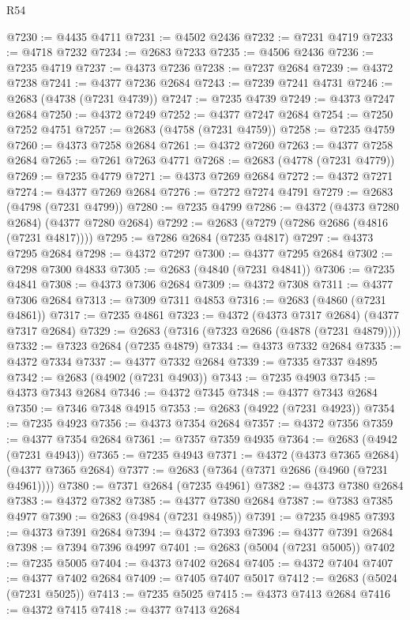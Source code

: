 \begin{lexlean}{R54}
\begin{coremodule}
@7230 := @4435 @4711
@7231 := @4502 @2436
@7232 := @7231 @4719
@7233 := @4718 @7232
@7234 := @2683 @7233
@7235 := @4506 @2436
@7236 := @7235 @4719
@7237 := @4373 @7236
@7238 := @7237 @2684
@7239 := @4372 @7238
@7241 := @4377 @7236 @2684
@7243 := @7239 @7241 @4731
@7246 := @2683 (@4738 (@7231 @4739))
@7247 := @7235 @4739
@7249 := @4373 @7247 @2684
@7250 := @4372 @7249
@7252 := @4377 @7247 @2684
@7254 := @7250 @7252 @4751
@7257 := @2683 (@4758 (@7231 @4759))
@7258 := @7235 @4759
@7260 := @4373 @7258 @2684
@7261 := @4372 @7260
@7263 := @4377 @7258 @2684
@7265 := @7261 @7263 @4771
@7268 := @2683 (@4778 (@7231 @4779))
@7269 := @7235 @4779
@7271 := @4373 @7269 @2684
@7272 := @4372 @7271
@7274 := @4377 @7269 @2684
@7276 := @7272 @7274 @4791
@7279 := @2683 (@4798 (@7231 @4799))
@7280 := @7235 @4799
@7286 := @4372 (@4373 @7280 @2684) (@4377 @7280 @2684)
@7292 := @2683 (@7279 (@7286 @2686 (@4816 (@7231 @4817))))
@7295 := @7286 @2684 (@7235 @4817)
@7297 := @4373 @7295 @2684
@7298 := @4372 @7297
@7300 := @4377 @7295 @2684
@7302 := @7298 @7300 @4833
@7305 := @2683 (@4840 (@7231 @4841))
@7306 := @7235 @4841
@7308 := @4373 @7306 @2684
@7309 := @4372 @7308
@7311 := @4377 @7306 @2684
@7313 := @7309 @7311 @4853
@7316 := @2683 (@4860 (@7231 @4861))
@7317 := @7235 @4861
@7323 := @4372 (@4373 @7317 @2684) (@4377 @7317 @2684)
@7329 := @2683 (@7316 (@7323 @2686 (@4878 (@7231 @4879))))
@7332 := @7323 @2684 (@7235 @4879)
@7334 := @4373 @7332 @2684
@7335 := @4372 @7334
@7337 := @4377 @7332 @2684
@7339 := @7335 @7337 @4895
@7342 := @2683 (@4902 (@7231 @4903))
@7343 := @7235 @4903
@7345 := @4373 @7343 @2684
@7346 := @4372 @7345
@7348 := @4377 @7343 @2684
@7350 := @7346 @7348 @4915
@7353 := @2683 (@4922 (@7231 @4923))
@7354 := @7235 @4923
@7356 := @4373 @7354 @2684
@7357 := @4372 @7356
@7359 := @4377 @7354 @2684
@7361 := @7357 @7359 @4935
@7364 := @2683 (@4942 (@7231 @4943))
@7365 := @7235 @4943
@7371 := @4372 (@4373 @7365 @2684) (@4377 @7365 @2684)
@7377 := @2683 (@7364 (@7371 @2686 (@4960 (@7231 @4961))))
@7380 := @7371 @2684 (@7235 @4961)
@7382 := @4373 @7380 @2684
@7383 := @4372 @7382
@7385 := @4377 @7380 @2684
@7387 := @7383 @7385 @4977
@7390 := @2683 (@4984 (@7231 @4985))
@7391 := @7235 @4985
@7393 := @4373 @7391 @2684
@7394 := @4372 @7393
@7396 := @4377 @7391 @2684
@7398 := @7394 @7396 @4997
@7401 := @2683 (@5004 (@7231 @5005))
@7402 := @7235 @5005
@7404 := @4373 @7402 @2684
@7405 := @4372 @7404
@7407 := @4377 @7402 @2684
@7409 := @7405 @7407 @5017
@7412 := @2683 (@5024 (@7231 @5025))
@7413 := @7235 @5025
@7415 := @4373 @7413 @2684
@7416 := @4372 @7415
@7418 := @4377 @7413 @2684

\end{coremodule}
\end{lexlean}
